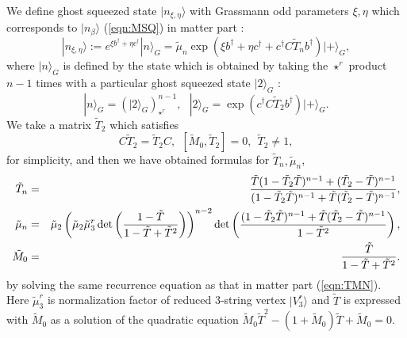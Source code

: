 \documentclass[12pt,a4paper]{article}
\def\T{{\tilde T}}
\def\M0{{\tilde M}_0}
\def\tm{{\tilde \mu}}
\begin{document}
We define ghost squeezed state $|n_{\xi,\eta}\rangle$ with Grassmann odd parameters $\xi,\eta$ which corresponds to $|n_\beta\rangle$ (\ref{eqn:MSQ}) in matter part :
\begin{equation}
\label{eqn:NXH}
|n_{\xi,\eta}\rangle:=e^{\xi b^\dagger+\eta c^\dagger}|n\rangle_G=\tm_n \exp\left(\xi b^\dagger+\eta c^\dagger+c^\dagger C\T_n b^\dagger\right)|+\rangle_G, 
\end{equation}
where $|n\rangle_G$ is defined by the state which is obtained by taking the $\star^r$ product $n-1$ times with a particular ghost squeezed state $|2\rangle_G$ :
\begin{equation}
\label{eqn:GNWED}
|n\rangle_G=\left(|2\rangle_G\right)_{\star^r}^{n-1},\ \ \ |2\rangle_G=\exp\left(c^\dagger C\T_2 b^\dagger\right)|+\rangle_G.
\end{equation}
We take a matrix $\T_2$ which satisfies
\begin{equation}
C\T_2=\T_2C,\ \ [\M0 ,\T_2]=0,\ \ \T_2\not=1,
\end{equation}
for simplicity, and then we have obtained formulas for $\T_n,\tm_n$,
\begin{eqnarray}
\label{eqn:TNTIL}
\T_n &=&{\T (1-\T_2 \T)^{n-1}+(\T_2-\T )^{n-1}\over(1-\T_2 \T)^{n-1}+\T (\T_2-\T )^{n-1}}, \nonumber\\
\tm_n &=& \tm_2 \left(\tm_2 \tm_3^r \det\left({1-\T \over1-\T+\T^2}\right)\right)^{n-2}\det\left({(1-\T_2 \T )^{n-1}+\T(\T_2- \T )^{n-1}\over1-\T^2 }\right),\nonumber \\
\M0 &=&{\T\over1-\T+\T^2}.
\end{eqnarray}
by solving the same recurrence equation as that in matter part (\ref{eqn:TMN}).
Here $\tm_3^r$ is normalization factor of reduced 3-string vertex  $|V_3^r\rangle$ and $\T$ is expressed with $\M0$ as a solution of the quadratic equation
$\M0 \T^2-(1+\M0 )\T +\M0=0$.
\end{document}
